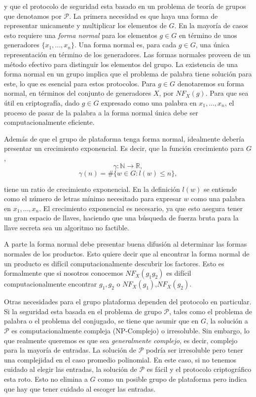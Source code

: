 \documentclass[12pt]{article}
\theoremstyle{definition}
\begin{document}
y que el protocolo de seguridad esta basado en un problema de teoría de grupos que denotamos por $\mathcal{P}$. La primera necesidad es que haya una forma de representar unicamente y multiplicar los elementos de $G$. En la mayoría de casos esto requiere una \textit{forma normal} para los elementos $g\in G$ en término de unos generadores $\{x_1,...,x_n\}$. Una forma normal es, para cada $g\in G$, una única representación en término de los generadores. Las formas normales proveen de un método efectivo para distinguir los elementos del grupo. La existencia de una forma normal en un grupo implica que el problema de palabra tiene solución para este, lo que es esencial para estos protocolos. Para $g\in G$ denotaremos su forma normal, en términos del conjunto de generadores $X$, por $NF_X(g)$. Para que sea útil en criptografía, dado $g\in G$ expresado como una palabra en $x_1,...,x_n$, el proceso de pasar de la palabra a la forma normal única debe ser computacionalmente eficiente.

Además de que el grupo de plataforma tenga forma normal, idealmente debería presentar un crecimiento exponencial. Es decir, que la función crecimiento para $G$,
$$\gamma:\mathbb{N}\rightarrow\mathbb{R},$$
$$\gamma(n)=\#\{w\in G:l(w)\leq n\},$$

tiene un ratio de crecimiento exponencial. En la definición $l(w)$ se entiende como el número de letras mínimo necesitado para expresar $w$ como una palabra en $x_1,...,x_n$. El crecimiento exponencial es necesario, ya que esto asegura tener un gran espacio de llaves, haciendo que una búsqueda de fuerza bruta para la llave secreta sea un algoritmo no factible.

A parte la forma normal debe presentar buena difusión al determinar las formas normales de los productos. Esto quiere decir que al encontrar la forma normal de un producto es difícil computacionalmente descubrir los factores. Esto es formalmente que si nosotros conocemos $NF_X(g_1g_2)$ es difícil computacionalmente encontrar $g_1,g_2$ o $NF_X(g_1)$,$NF_X(g_2)$.

Otras necesidades para el grupo plataforma dependen del protocolo en particular. Si la seguridad esta basada en el problema de grupo $\mathcal{P}$, tales como el problema de palabra o el problema del conjugado, se tiene que asumir que en $G$, la solución a $\mathcal{P}$ es computacionalmente compleja (NP-Complejo) o irresoluble. Sin embargo, lo que realmente queremos es que sea \textit{generalmente complejo}, es decir, complejo para la mayoría de entradas. La solución de $\mathcal{P}$ podría ser irresoluble pero tener una complejidad en el caso promedio polinomial. En este caso, si no tenemos cuidado al elegir las entradas, la solución de $\mathcal{P}$ es fácil y el protocolo criptográfico esta roto. Esto no elimina a $G$ como un posible grupo de plataforma pero indica que hay que tener cuidado al escoger las entradas.
\end{document}
